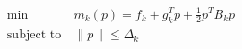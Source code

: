 %
\begin{equation}
\begin{aligned}
    \min\ &m_k(p) = f_k+g_k^Tp+\frac{1}{2}p^TB_kp\\
    \text{subject to}\ &\|p\| \leq \Delta_k
\end{aligned}
\end{equation}

